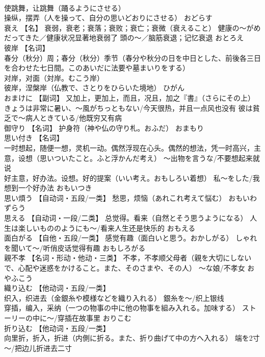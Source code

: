 \documentclass[8pt]{extreport}
\begin{document}
\begin{CJK}{UTF8}{min}
\\	使跳舞，让跳舞（踊るようにさせる） 
\\	操纵，摆弄（人を操って、自分の思いどおりにさせる）	おどらす	
\\	衰え	【名】 衰弱，衰老；衰落；衰败；衰亡；衰微（衰えること） 健康の～がめだってきた／健康状况显著地衰弱了 頭の～／脑筋衰退；记忆衰退	おとろえ	
\\	彼岸	【名词】 
\\	春分（秋分）周；春分（秋分）季节（春分や秋分の日を中日とした、前後各三日を合わせた七日間。このあいだに法要や墓まいりをする） 
\\	对岸，对面（対岸。むこう岸） 
\\	彼岸，涅槃岸（仏教で、さとりをひらいた境地）	ひがん	
\\	おまけに	【副词】 又加上，更加上，而且，况且，加之『書』（さらにその上） きょうは非常に暑い、～風がちっともない/今天很热，并且一点风也没有 彼は貧乏で～病人ときている/他既穷又有病		
\\	御守り	【名词】 护身符（神や仏の守り札。おふだ）	おまもり	
\\	思い付き	【名词】 
\\	一时想起，随便一想，灵机一动。偶然浮现在心头。偶然的想法，凭一时高兴，主意，设想（思いついたこと。ふと浮かんだ考え） ～出物を言うな/不要想起来就说 
\\	好主意，好办法。设想。好的提案（いい考え。おもしろい着想） 私～をした/我想到一个好办法	おもいつき	
\\	思い煩う	【自动词・五段/一类】 愁思，烦恼（あれこれ考えて悩む）	おもいわずらう	
\\	思える	【自动词・一段/二类】 总觉得。看来（自然とそう思うようになる） 人生は楽しいもののようにも～/看来人生还是快乐的	おもえる	
\\	面白がる	【自他・五段/一类】 感觉有趣（面白いと思う。おかしがる） しゃれを聞いて～/听俏皮话觉得有趣	おもしろがる	
\\	親不孝	【名词・形动・他动・三类】 不孝，不孝顺父母者（親を大切にしないで、心配や迷惑をかけること。また、そのさまや、その人） ～な娘/不孝女	おやふこう	
\\	織り込む	【他动词・五段/一类】 
\\	织入，织进去（金銀糸や模様などを織り入れる） 銀糸を～/织上银线 
\\	穿插，编入，采纳（一つの物事の中に他の物事を組み入れる。加味する） ストーリーの中に～/穿插在故事里	おりこむ	
\\	折り込む	【他动词・五段/一类】 
\\	向里折，折入，折进（内側に折る。また、折り曲げて中の方へ入れる） 端を2寸～/把边儿折进去二寸 

\end{CJK}
\end{document}
